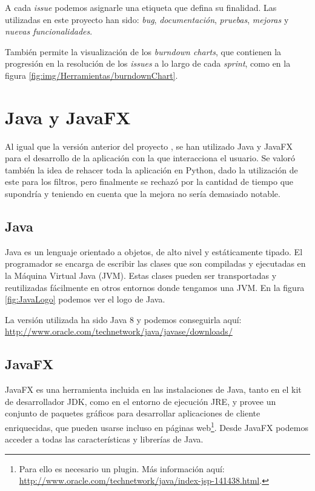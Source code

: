 A cada \textit{issue} podemos asignarle una etiqueta que defina su finalidad. Las utilizadas en este proyecto han sido: \textit{bug}, \textit{documentación}, \textit{pruebas}, \textit{mejoras} y \textit{nuevas funcionalidades}. 

También permite la visualización de los \textit{burndown charts}, que contienen la progresión en la resolución de los \textit{issues} a lo largo de cada \textit{sprint}, como en la figura \ref{fig:img/Herramientas/burndownChart}.

\newpage
\section{Java y JavaFX}
Al igual que la versión anterior del proyecto \cite{perikymataV1}, se han utilizado Java y JavaFX para el desarrollo de la aplicación con la que interacciona el usuario. Se valoró también la idea de rehacer toda la aplicación en Python, dado la utilización de este para los filtros, pero finalmente se rechazó por la cantidad de tiempo que supondría y teniendo en cuenta que la mejora no sería demasiado notable. 

\subsection{Java}
Java \cite{ubu:Metodologia} es un lenguaje orientado a objetos, de alto nivel y estáticamente tipado. El programador se encarga de escribir las clases que son compiladas y ejecutadas en la Máquina Virtual Java (JVM). Estas clases pueden ser transportadas y reutilizadas fácilmente en otros entornos donde tengamos una JVM. En la figura \ref{fig:JavaLogo} podemos ver el logo de Java.

La versión utilizada ha sido Java 8 y podemos conseguirla aquí: \\ \url{http://www.oracle.com/technetwork/java/javase/downloads/}


\subsection{JavaFX} \label{th:JavaFX}
JavaFX \cite{JavaFX} es una herramienta incluida en las instalaciones de Java, tanto en el kit de desarrollador JDK, como en el entorno de ejecución JRE, y provee un conjunto de paquetes gráficos para desarrollar aplicaciones de cliente enriquecidas, que pueden usarse incluso en páginas web\footnote{Para ello es necesario un plugin. Más información aquí: \url{http://www.oracle.com/technetwork/java/index-jsp-141438.html}.}. Desde JavaFX podemos  acceder a todas las características y librerías de Java. 

